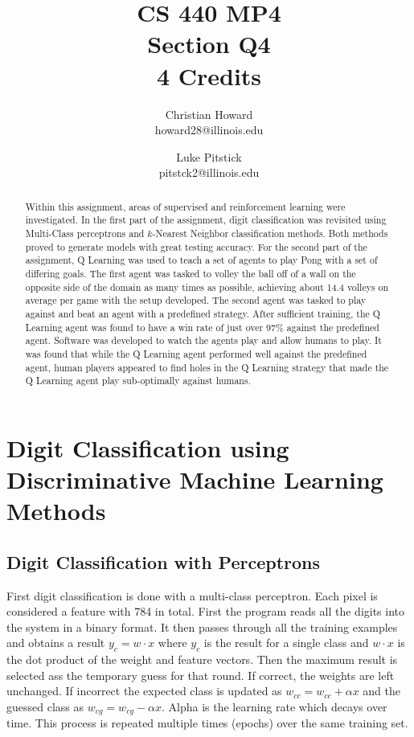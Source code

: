 \documentclass{article}[12pt]
\title{CS 440 MP4 \\ Section Q4 \\ 4 Credits}
\author{
Christian Howard \\ howard28@illinois.edu
\and
Luke Pitstick \\ pitstck2@illinois.edu
}
\date{} %
\begin{document}
   
   \maketitle
   \begin{abstract}
   	Within this assignment, areas of supervised and reinforcement learning were investigated. In the first part of the assignment, digit classification was revisited using Multi-Class perceptrons and $k$-Nearest Neighbor classification methods. Both methods proved to generate models with great testing accuracy. For the second part of the assignment, Q Learning was used to teach a set of agents to play Pong with a set of differing goals. The first agent was tasked to volley the ball off of a wall on the opposite side of the domain as many times as possible, achieving about 14.4 volleys on average per game with the setup developed. The second agent was tasked to play against and beat an agent with a predefined strategy. After sufficient training, the Q Learning agent was found to have a win rate of just over 97\% against the predefined agent. Software was developed to watch the agents play and allow humans to play. It was found that while the Q Learning agent performed well against the predefined agent, human players appeared to find holes in the Q Learning strategy that made the Q Learning agent play sub-optimally against humans.
   \end{abstract}
   \newpage
   
   \tableofcontents
   \newpage
   
   \section{Digit Classification using Discriminative Machine Learning Methods} \label{sec:one}
   
   \subsection{Digit Classification with Perceptrons}
   
   First digit classification is done with a multi-class perceptron. Each pixel is considered a feature with 784 in total. First the program reads all the digits into the system in a binary format. It then passes through all the training examples and obtains a result $y_c = w \cdot x$ where $y_c$ is the result for a single class and $w\cdot x$ is the dot product of the weight and feature vectors. Then the maximum result is selected ass the temporary guess for that round. If correct, the weights are left unchanged. If incorrect the expected class is updated as $w_{cc} = w_{cc} + \alpha x$ and the guessed class as $w_{cg} = w_{cg} - \alpha x$. Alpha is the learning rate which decays over time. This process is repeated multiple times (epochs) over the same training set.
   
\end{document}
